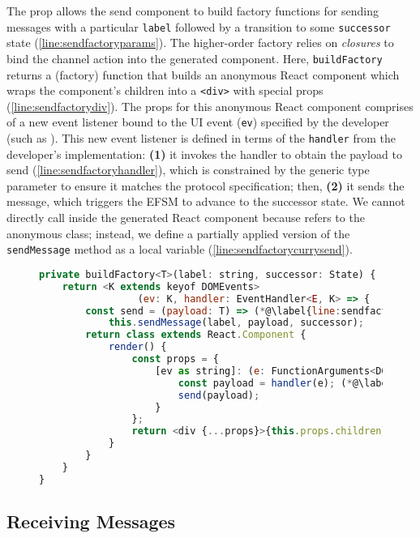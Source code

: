 The prop allows the send component to build factory functions
for sending messages with a particular \texttt{label}
followed by a transition to some \texttt{successor} state
(\cref{line:sendfactoryparams}).
The higher-order factory relies on \textit{closures}
to bind the channel action into the generated component.
Here, \texttt{buildFactory} returns a (factory) function that
builds an anonymous React component which wraps the 
component's children into a \texttt{<div>} with special props 
(\cref{line:sendfactorydiv}).
The props for this anonymous React component comprises of a new
event listener bound to the UI event (\texttt{ev})
specified by the developer (such as ).
This new event listener is defined in terms of the
\texttt{handler} from the developer's implementation:
\textbf{(1)} it invokes the handler to obtain the payload to send 
(\cref{line:sendfactoryhandler}), which is constrained by
the generic type parameter to ensure it matches the protocol specification;
then, \textbf{(2)} it sends the message, which triggers the EFSM
to advance to the successor state.
We cannot directly call  inside
the generated React component because  refers
to the anonymous class; instead, we define a partially applied
version of the \texttt{sendMessage} method as a local variable 
(\cref{line:sendfactorycurrysend}).

\begin{figure}[!h]
\begin{lstlisting}[language=javascript,tabsize=2]
private buildFactory<T>(label: string, successor: State) { (*@\label{line:sendfactoryparams}@*)
	return <K extends keyof DOMEvents>
				 (ev: K, handler: EventHandler<E, K> => {
		const send = (payload: T) => (*@\label{line:sendfactorycurrysend}@*)
			this.sendMessage(label, payload, successor);
		return class extends React.Component {
			render() {
				const props = {
					[ev as string]: (e: FunctionArguments<DOMEvents[K]>) => {
						const payload = handler(e); (*@\label{line:sendfactoryhandler}@*)
						send(payload);
					}
				};
				return <div {...props}>{this.props.children}</div> (*@\label{line:sendfactorydiv}@*)
			}		
		}	
	}
}
\end{lstlisting}
\label{lst:reactsendfactory}
\end{figure}

\subsection{Receiving Messages}

